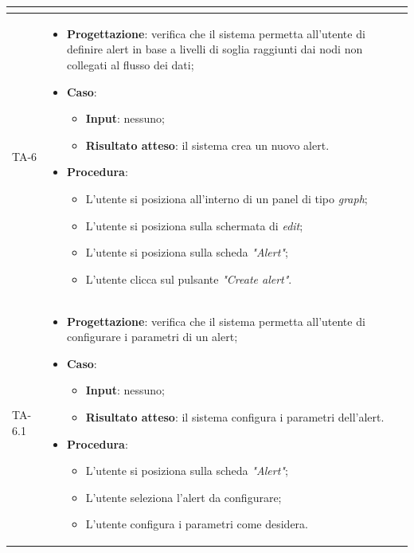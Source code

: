 \begin{longtable}{|C{2.5cm}|C{13cm}|}
\begin{itemize}
\begin{itemize}
	\end{itemize} 
\end{itemize} \\
\hline
{TA-6} &
\begin{itemize}
	\item \textbf{Progettazione}: verifica che il sistema permetta all'utente di definire alert in base a livelli di soglia raggiunti dai nodi non collegati al flusso dei dati;
	\item \textbf{Caso}: 
	\begin{itemize}
		\item \textbf{Input}: nessuno;
		\item \textbf{Risultato atteso}: il sistema crea un nuovo alert.
	\end{itemize}
	\item \textbf{Procedura}:
	\begin{itemize}
		\item L'utente si posiziona all'interno di un panel di tipo \emph{graph};
		\item L'utente si posiziona sulla schermata di \emph{edit};
		\item L'utente si posiziona sulla scheda \emph{"Alert"};
		\item L'utente clicca sul pulsante \emph{"Create alert"}.
	\end{itemize} 
\end{itemize} \\
\hline
{TA-6.1} &
\begin{itemize}
	\item \textbf{Progettazione}: verifica che il sistema permetta all'utente di configurare i parametri di un alert;
	\item \textbf{Caso}: 
	\begin{itemize}
		\item \textbf{Input}: nessuno;
		\item \textbf{Risultato atteso}: il sistema configura i parametri dell'alert.
	\end{itemize}
	\item \textbf{Procedura}:
	\begin{itemize}
		\item L'utente si posiziona sulla scheda \emph{"Alert"};
		\item L'utente seleziona l'alert da configurare;
		\item L'utente configura i parametri come desidera.
	\end{itemize} 
\end{itemize} \\

\end{longtable}
